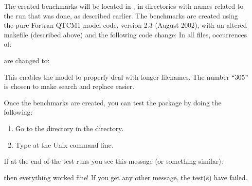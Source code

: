 The created benchmarks will be located in 
, in directories with names related to the
run that was done, as described earlier.
The benchmarks are created using the
pure-Fortran QTCM1 model code,
version 2.3 (August 2002), with an altered makefile
(described above) and the following code change:
In all  files, occurrences of:
        \begin{codeblock}
        \end{codeblock}
        are changed to:
        \begin{codeblock}
        \end{codeblock}
This enables the model to properly deal with longer filenames.
The number ``305'' is chosen to make search and replace easier.

Once the benchmarks are created, you can test the  package
by doing the following:
\begin{enumerate}
\item Go to the  directory in the 
	\fn{}directory.
\item Type  at the Unix command line.
\end{enumerate}

If at the end of the test runs you see this message (or something similar):
\begin{codeblock}
\end{codeblock}
then everything worked fine!  If you get any other message, the test(s) have
failed.



